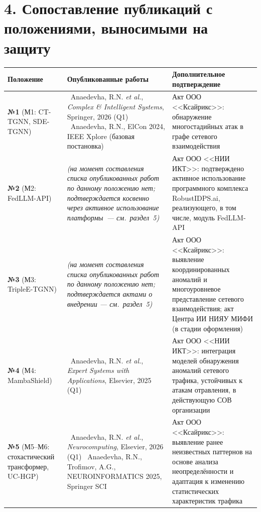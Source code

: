 \documentclass[11pt,a4paper]{article}
\begin{document}
\section*{4. Сопоставление публикаций с положениями, выносимыми на защиту}

\begin{longtable}{>{\raggedright\arraybackslash}p{} >{\raggedright\arraybackslash}p{} >{\centering\arraybackslash}p{}}
\toprule
\textbf{Положение} & \textbf{Опубликованные работы} & \textbf{Дополнительное подтверждение} \\
\midrule
\endhead

\textbf{№1} (М1: CT-TGNN, SDE-TGNN) &
[3]~Anaedevha, R.N. \textit{et al.}, \textit{Complex \& Intelligent Systems}, Springer, 2026 (Q1) \newline
[7]~Anaedevha, R.N., ElCon 2024, IEEE Xplore (базовая постановка) &
Акт ООО <<Ксайрикс>>: обнаружение многостадийных атак в графе сетевого взаимодействия \\
\midrule

\textbf{№2} (М2: FedLLM-API) &
\emph{(на момент составления списка опубликованных работ по данному положению нет; подтверждается косвенно через активное использование платформы~--- см.~раздел~5)} &
Акт ООО <<НИИ ИКТ>>: подтверждено активное использование программного комплекса RobustIDPS.ai, реализующего, в том числе, модуль FedLLM-API \\
\midrule

\textbf{№3} (М3: TripleE-TGNN) &
\emph{(на момент составления списка опубликованных работ по данному положению нет; подтверждается актами о внедрении --- см.~раздел~5)} &
Акт ООО <<Ксайрикс>>: выявление координированных аномалий и многоуровневое представление сетевого взаимодействия; акт Центра ИИ НИЯУ МИФИ (в стадии оформления) \\
\midrule

\textbf{№4} (М4: MambaShield) &
[1]~Anaedevha, R.N. \textit{et al.}, \textit{Expert Systems with Applications}, Elsevier, 2025 (Q1) &
Акт ООО <<НИИ ИКТ>>: интеграция моделей обнаружения аномалий сетевого трафика, устойчивых к атакам отравления, в действующую СОВ организации \\
\midrule

\textbf{№5} (М5--М6: стохастический трансформер, UC-HGP) &
[2]~Anaedevha, R.N. \textit{et al.}, \textit{Neurocomputing}, Elsevier, 2026 (Q1) \newline
[5]~Anaedevha, R.N., Trofimov, A.G., NEUROINFORMATICS 2025, Springer SCI &
Акт ООО <<Ксайрикс>>: выявление ранее неизвестных паттернов на основе анализа неопределённости и адаптация к изменению статистических характеристик трафика \\
\midrule


\end{longtable}
\end{document}
